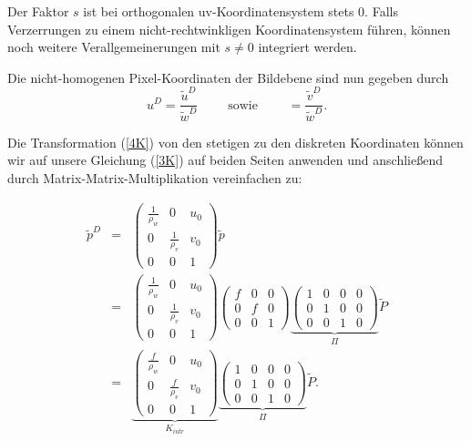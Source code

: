 {Der Faktor $s$ ist bei orthogonalen uv-Koordinatensystem stets 0. 
Falls Verzerrungen zu einem nicht-rechtwinkligen Koordinatensystem führen, 
können noch weitere Verallgemeinerungen mit $s \neq 0$ integriert werden.

Die nicht-homogenen Pixel-Koordinaten der Bildebene sind nun gegeben durch 
\begin{equation} \label{10K}
    u^D = \frac{\tilde u^D}{\tilde w^D} \qquad \mbox{     sowie     } \qquad  = \frac{\tilde v^D}{\tilde w^D}.
\end{equation}

Die Transformation (\ref{4K}) von den stetigen zu den diskreten Koordinaten 
können wir auf unsere Gleichung (\ref{3K}) auf beiden Seiten anwenden und 
anschließend durch Matrix-Matrix-Multiplikation vereinfachen zu:

\begin{eqnarray} \label{6K}
    \tilde {p}^D & = & 
    \left ( 
    \begin{array}{ccc}
        \frac{1}{\rho_w}	& 0 				& u_0 \\ 
        0 					&  \frac{1}{\rho_v} & v_0 \\ 
        0 					& 0					& 1
    \end{array}
    \right )
    \tilde p \nonumber \\
    & = & 
    \left ( 
    \begin{array}{ccc}
        \frac{1}{\rho_w}	& 0 				& u_0 \\ 
        0 					&  \frac{1}{\rho_v} & v_0 \\ 
        0 					& 0					& 1
    \end{array}
    \right )
    \left ( 
    \begin{array}{ccc}
        f & 0 & 0 \\ 
        0 & f & 0 \\ 
        0 & 0 & 1
    \end{array}
    \right )
    \underbrace{
        \left ( 
        \begin{array}{cccc}
            1 & 0 & 0 & 0 \\ 
            0 & 1 & 0 & 0 \\ 
            0 & 0 & 1 & 0
        \end{array}
        \right )}_{\Pi}
    \tilde P \nonumber\\
    & = &
    \underbrace{	\left ( 
        \begin{array}{ccc}
            \frac{f}{\rho_w}  	& 0 				& u_0 \\ 
            0 					& \frac{f}{\rho_v} 	& v_0 \\ 
            0 					& 0					& 1
        \end{array}
        \right )}_{K_{intr}}
    \underbrace{
        \left ( 
        \begin{array}{cccc}
            1 & 0 & 0 & 0\\ 
            0 & 1 & 0 & 0 \\ 
            0 & 0 & 1 & 0
        \end{array}
        \right )}_{\Pi}
    \tilde P.
\end{eqnarray}

}
